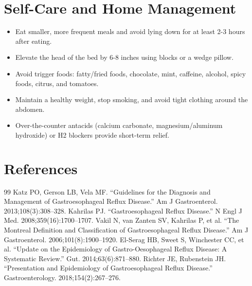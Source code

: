 \section*{Self-Care and Home Management}
\begin{itemize}
  \item Eat smaller, more frequent meals and avoid lying down for at least 2-3 hours after eating.
  \item Elevate the head of the bed by 6-8 inches using blocks or a wedge pillow.
  \item Avoid trigger foods: fatty/fried foods, chocolate, mint, caffeine, alcohol, spicy foods, citrus, and tomatoes.
  \item Maintain a healthy weight, stop smoking, and avoid tight clothing around the abdomen.
  \item Over-the-counter antacids (calcium carbonate, magnesium/aluminum hydroxide) or H2 blockers provide short-term relief.
\end{itemize}

\section*{References}
\begin{thebibliography}{99}
 Katz PO, Gerson LB, Vela MF. ``Guidelines for the Diagnosis and Management of Gastroesophageal Reflux Disease.'' Am J Gastroenterol. 2013;108(3):308--328.
 Kahrilas PJ. ``Gastroesophageal Reflux Disease.'' N Engl J Med. 2008;359(16):1700--1707.
 Vakil N, van Zanten SV, Kahrilas P, et al. ``The Montreal Definition and Classification of Gastroesophageal Reflux Disease.'' Am J Gastroenterol. 2006;101(8):1900--1920.
 El-Serag HB, Sweet S, Winchester CC, et al. ``Update on the Epidemiology of Gastro-Oesophageal Reflux Disease: A Systematic Review.'' Gut. 2014;63(6):871--880.
 Richter JE, Rubenstein JH. ``Presentation and Epidemiology of Gastroesophageal Reflux Disease.'' Gastroenterology. 2018;154(2):267--276.
\end{thebibliography}

